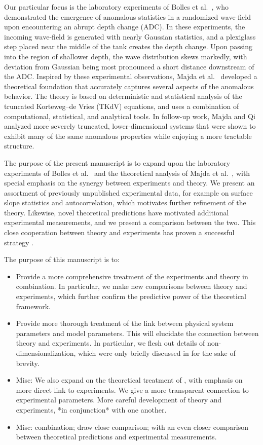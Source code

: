 \documentclass[11pt]{article}
\begin{document}
Our particular focus is the laboratory experiments of Bolles et al.~\cite{bolles2019anomalous}, who demonstrated the emergence of anomalous statistics in a randomized wave-field upon encountering an abrupt depth change (ADC). In these experiments, the incoming wave-field is generated with nearly Gaussian statistics, and a plexiglass step placed near the middle of the tank creates the depth change. Upon passing into the region of shallower depth, the wave distribution skews markedly, with deviation from Gaussian being most pronounced a short distance downstream of the ADC. 
Inspired by these experimental observations, Majda et al.~\cite{majda2019statistical} developed a theoretical foundation that accurately captures several aspects of the anomalous behavior. The theory is based on deterministic and statistical analysis of the truncated Korteweg–de Vries (TKdV) equations, and uses a combination of computational, statistical, and analytical tools. In follow-up work, Majda and Qi \cite{majdaqi2019} analyzed more severely truncated, lower-dimensional systems that were shown to exhibit many of the same anomalous properties while enjoying a more tractable structure.

The purpose of the present manuscript is to expand upon the laboratory experiments of Bolles et al.~\cite{bolles2019anomalous} and the theoretical analysis of Majda et al.~\cite{majda2019statistical, majdaqi2019}, with special emphasis on the synergy between experiments and theory. We present an assortment of previously unpublished experimental data, for example on surface slope statistics and autocorrelation, which motivates further refinement of the theory. Likewise, novel theoretical predictions have motivated additional experimental measurements, and we present a comparison between the two. This close cooperation between theory and experiments has proven a successful strategy \cite{camassa2012stratified, ristroph2012, ganedi2018equilibrium}.


The purpose of this manuscript is to:
\begin{itemize}
\item Provide a more comprehensive treatment of the experiments and theory in combination. In particular, we make new comparisons between theory and experiments, which further confirm the predictive power of the theoretical framework.
\item Provide more thorough treatment of the link between physical system parameters and model parameters. This will elucidate the connection between theory and experiments. In particular, we flesh out details of non-dimensionalization, which were only briefly discussed in \cite{majda2019statistical} for the sake of brevity. 
\item Misc: We also expand on the theoretical treatment of \cite{majda2019statistical}, with emphasis on more direct link to experiments.
We give a more transparent connection to experimental parameters. More careful development of theory and experiments, *in conjunction* with one another.
\item Misc: combination; draw close comparison; with an even closer comparison between theoretical predictions and experimental measurements.
\end{itemize}
\end{document}
